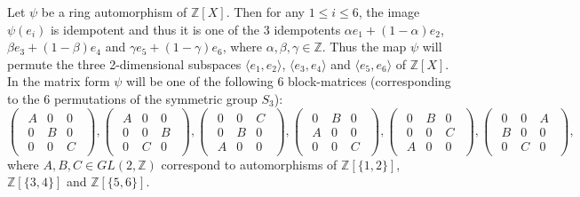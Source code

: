 \documentclass[12pt]{amsart}
\theoremstyle{definition}
\theoremstyle{remark}
\newcommand{\Z}{\mathbb{Z}}
\begin{document}
 Let $\psi$ be a ring automorphism of $\mathbb{Z}[X]$.  Then for any $1\leq i \leq 6$, the image $\psi(e_i)$ is idempotent and thus it is one of the 3 idempotents  $\alpha e_1 +(1-\alpha)e_2$, $\beta e_3+(1-\beta)e_4$ and $\gamma e_5 +(1-\gamma)e_6$, where $\alpha, \beta, \gamma \in \mathbb{Z}$.  Thus the map $\psi$ will permute the three 2-dimensional  subspaces $\langle e_1,e_2 \rangle$, $\langle e_3,e_4 \rangle$ and $\langle e_5,e_6 \rangle$ of $\mathbb{Z}[X]$.  In the matrix form $\psi$ will be one of the following $6$ block-matrices (corresponding to the $6$ permutations of the symmetric group $S_3$):
\begin{equation*}
\begin{pmatrix}
\begin{matrix} 
A & 0 & 0 \\
0 & B& 0\\
0 & 0 &C
\end{matrix}
\end{pmatrix},
\begin{pmatrix}
\begin{matrix} 
A & 0 & 0 \\
0 & 0& B\\
0 & C&0
\end{matrix}
\end{pmatrix},
\begin{pmatrix}
\begin{matrix} 
0 & 0 & C \\
0& B & 0\\
A & 0&0
\end{matrix}
\end{pmatrix},
\begin{pmatrix}
\begin{matrix} 
0& B & 0 \\
A &0 & 0\\
0 & 0 & C
\end{matrix}
\end{pmatrix},
\begin{pmatrix}
\begin{matrix} 
0 & B & 0 \\
0 & 0& C\\
A & 0&0
\end{matrix}
\end{pmatrix},
\begin{pmatrix}
\begin{matrix} 
0 & 0& A \\
B & 0 & 0\\
0 & C&0
\end{matrix}
\end{pmatrix},
\end{equation*}
 where $A,B,C \in GL(2, \mathbb{Z})$ correspond to automorphisms of $\Z[\{1, 2\}]$,  $\Z[\{3, 4\}]$ and  $\Z[\{5, 6\}]$.
\end{document}
